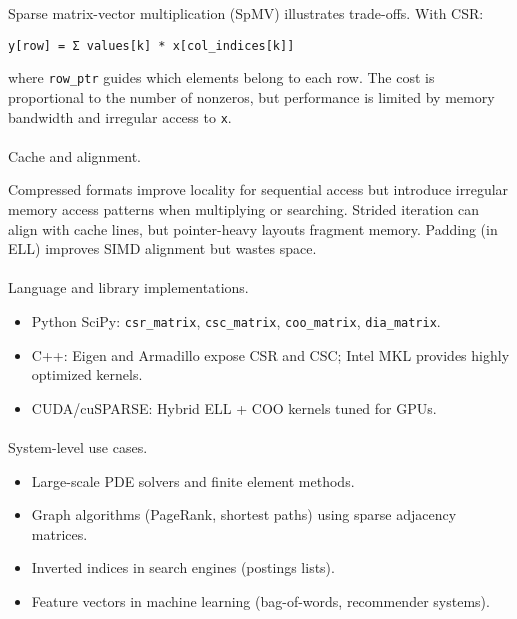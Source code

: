 \documentclass[
  letterpaper,
  DIV=11,
  numbers=noendperiod]{scrreprt}
\makeatletter
\let\oldparagraph\paragraph
\renewcommand{\paragraph}{
    \@ifstar
      \xxxParagraphStar
      \xxxParagraphNoStar
  }
\newcommand{\xxxParagraphStar}[1]{\oldparagraph*{#1}\mbox{}}
\newcommand{\xxxParagraphNoStar}[1]{\oldparagraph{#1}\mbox{}}
\providecommand{\tightlist}{%
  \setlength{\itemsep}{0pt}\setlength{\parskip}{0pt}}
\makeatother
\begin{document}
Sparse matrix-vector multiplication (SpMV) illustrates trade-offs. With
CSR:

\begin{verbatim}
y[row] = Σ values[k] * x[col_indices[k]]  
\end{verbatim}

where \texttt{row\_ptr} guides which elements belong to each row. The
cost is proportional to the number of nonzeros, but performance is
limited by memory bandwidth and irregular access to \texttt{x}.

\paragraph{Cache and alignment.}\label{cache-and-alignment.}

Compressed formats improve locality for sequential access but introduce
irregular memory access patterns when multiplying or searching. Strided
iteration can align with cache lines, but pointer-heavy layouts fragment
memory. Padding (in ELL) improves SIMD alignment but wastes space.

\paragraph{Language and library
implementations.}\label{language-and-library-implementations.}

\begin{itemize}
\tightlist
\item
  Python SciPy: \texttt{csr\_matrix}, \texttt{csc\_matrix},
  \texttt{coo\_matrix}, \texttt{dia\_matrix}.
\item
  C++: Eigen and Armadillo expose CSR and CSC; Intel MKL provides highly
  optimized kernels.
\item
  CUDA/cuSPARSE: Hybrid ELL + COO kernels tuned for GPUs.
\end{itemize}

\paragraph{System-level use cases.}\label{system-level-use-cases.-1}

\begin{itemize}
\tightlist
\item
  Large-scale PDE solvers and finite element methods.
\item
  Graph algorithms (PageRank, shortest paths) using sparse adjacency
  matrices.
\item
  Inverted indices in search engines (postings lists).
\item
  Feature vectors in machine learning (bag-of-words, recommender
  systems).
\end{itemize}
\end{document}
